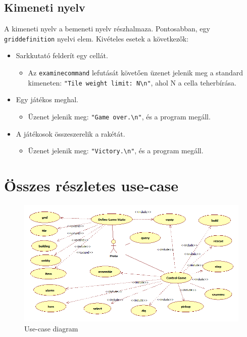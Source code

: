 \subsection{Kimeneti nyelv}
A kimeneti nyelv a bemeneti nyelv részhalmaza. Pontosabban, egy  \texttt{grid\textunderscore{}definition} nyelvi elem. Kivételes esetek a következők:
\begin{itemize}
\item Sarkkutató felderít egy cellát.
	\begin{itemize}
	\item Az \texttt{examine\textunderscore{}command} lefutását követően üzenet jelenik meg a standard kimeneten: \newline \texttt{"Tile weight limit: N\textbackslash{}n"}, ahol N a cella teherbírása.
	\end{itemize}
\item Egy játékos meghal.
	\begin{itemize}
	\item Üzenet jelenik meg: \texttt{"Game over.\textbackslash{}n"}, és a program megáll.
	\end{itemize}
\item A játékosok összeszerelik a rakétát.
	\begin{itemize}
	\item Üzenet jelenik meg: \texttt{"Victory.\textbackslash{}n"}, és a program megáll.
	\end{itemize}
\end{itemize}

\section{Összes részletes use-case}

\begin{figure}[h]
\begin{center}
\includegraphics[width=17cm]{chapters/chapter07/ProtoUseCases.png}
\caption{Use-case diagram}
\label{fig:ProtoUseCases}
\end{center}
\end{figure}

